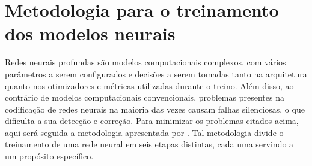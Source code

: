 \section{Metodologia para o treinamento dos modelos neurais}
\label{sec:TrainDeepModel}

Redes neurais profundas são modelos computacionais complexos, com vários parâmetros a serem configurados e decisões a serem tomadas tanto na arquitetura quanto nos otimizadores e métricas utilizadas durante o treino. Além disso, ao contrário de modelos computacionais convencionais, problemas presentes na codificação de redes neurais na maioria das vezes causam falhas silenciosas, o que dificulta a sua detecção e correção. Para minimizar os problemas citados acima, aqui será seguida a metodologia apresentada por .  Tal metodologia divide o treinamento de uma rede neural em seis etapas distintas, cada uma servindo a um propósito específico.

